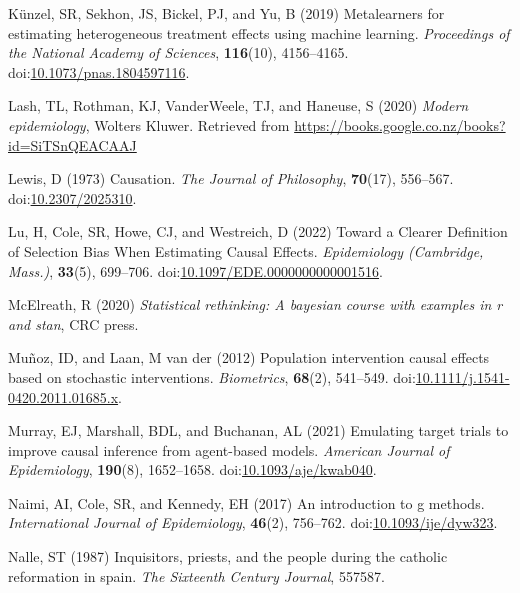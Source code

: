 \documentclass[
  singlecolumn,
  9pt]{article}
\begin{document}
\begin{CSLReferences}
Künzel, SR, Sekhon, JS, Bickel, PJ, and Yu, B (2019) Metalearners for
estimating heterogeneous treatment effects using machine learning.
\emph{Proceedings of the National Academy of Sciences},
\textbf{116}(10), 4156--4165.
doi:\href{https://doi.org/10.1073/pnas.1804597116}{10.1073/pnas.1804597116}.

Lash, TL, Rothman, KJ, VanderWeele, TJ, and Haneuse, S (2020)
\emph{Modern epidemiology}, Wolters Kluwer. Retrieved from
\url{https://books.google.co.nz/books?id=SiTSnQEACAAJ}

Lewis, D (1973) Causation. \emph{The Journal of Philosophy},
\textbf{70}(17), 556--567.
doi:\href{https://doi.org/10.2307/2025310}{10.2307/2025310}.

Lu, H, Cole, SR, Howe, CJ, and Westreich, D (2022) Toward a Clearer
Definition of Selection Bias When Estimating Causal Effects.
\emph{Epidemiology (Cambridge, Mass.)}, \textbf{33}(5), 699--706.
doi:\href{https://doi.org/10.1097/EDE.0000000000001516}{10.1097/EDE.0000000000001516}.

McElreath, R (2020) \emph{Statistical rethinking: A bayesian course with
examples in r and stan}, CRC press.

Muñoz, ID, and Laan, M van der (2012) Population intervention causal
effects based on stochastic interventions. \emph{Biometrics},
\textbf{68}(2), 541--549.
doi:\href{https://doi.org/10.1111/j.1541-0420.2011.01685.x}{10.1111/j.1541-0420.2011.01685.x}.

Murray, EJ, Marshall, BDL, and Buchanan, AL (2021) Emulating target
trials to improve causal inference from agent-based models.
\emph{American Journal of Epidemiology}, \textbf{190}(8), 1652--1658.
doi:\href{https://doi.org/10.1093/aje/kwab040}{10.1093/aje/kwab040}.

Naimi, AI, Cole, SR, and Kennedy, EH (2017) An introduction to g
methods. \emph{International Journal of Epidemiology}, \textbf{46}(2),
756--762.
doi:\href{https://doi.org/10.1093/ije/dyw323}{10.1093/ije/dyw323}.

Nalle, ST (1987) Inquisitors, priests, and the people during the
catholic reformation in spain. \emph{The Sixteenth Century Journal},
557587.


\end{CSLReferences}
\end{document}
